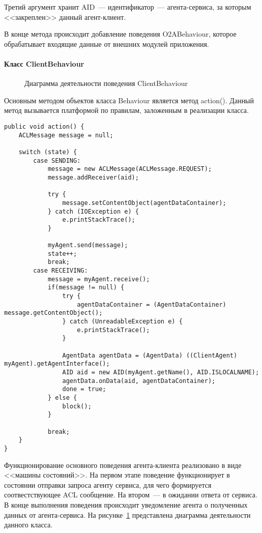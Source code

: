 Третий аргумент хранит AID~--- идентификатор~--- агента-сервиса, за которым <<закреплен>> данный агент-клиент.

В конце метода происходит добавление поведения O2ABehaviour, которое обрабатывает входящие данные от внешних модулей приложения.

\paragraph{Класс ClientBehaviour}
\begin{figure}[h!]
\caption{Диаграмма деятельности поведения ClientBehaviour}
\label{3:client-beh}
\end{figure}
Основным методом объектов класса Behaviour является метод action(). Данный метод вызывается платформой по правилам, заложенным в реализации класса.

\begin{lstlisting}
public void action() {
    ACLMessage message = null;

    switch (state) {
        case SENDING:
            message = new ACLMessage(ACLMessage.REQUEST);
            message.addReceiver(aid);

            try {
                message.setContentObject(agentDataContainer);
            } catch (IOException e) {
                e.printStackTrace();
            }

            myAgent.send(message);
            state++;
            break;
        case RECEIVING:
            message = myAgent.receive();
            if(message != null) {
                try {
                    agentDataContainer = (AgentDataContainer) message.getContentObject();
                } catch (UnreadableException e) {
                    e.printStackTrace();
                }

                AgentData agentData = (AgentData) ((ClientAgent) myAgent).getAgentInterface();
                AID aid = new AID(myAgent.getName(), AID.ISLOCALNAME);
                agentData.onData(aid, agentDataContainer);
                done = true;
            } else {
                block();
            }

            break;
    }
}
\end{lstlisting}
Функционирование основного поведения агента-клиента реализовано в виде <<машины состояний>>. На первом этапе поведение функционирует в состоянии отправки запроса агенту сервиса, для чего формируется соотвестствующее ACL сообщение. На втором~--- в ожидании ответа от сервиса. В конце выполнения поведения происходит уведомление агента о полученных данных от агента-сервиса.
На рисунке~\ref{3:client-beh} представлена диаграмма деятельности данного класса.

